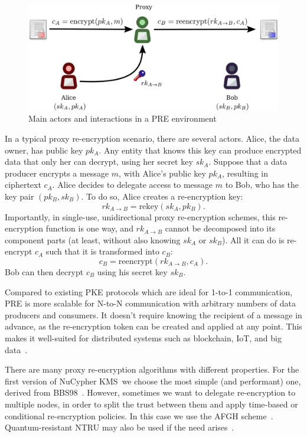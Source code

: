 \documentclass[longbibliography,nofootinbib]{revtex4-1}
\newcommand{\kms}{NuCypher KMS}
\begin{document}
\begin{figure}
\centering
    \includegraphics[width=0.6\columnwidth]{pdf/pre.pdf}
    \caption{Main actors and interactions in a PRE environment}
    \label{fig:pre}
\end{figure}

In a typical proxy re-encryption scenario, there are several actors. 
Alice, the data owner, has public key $pk_A$. Any entity that knows this key can produce encrypted data that only her can decrypt, using her secret key $sk_A$. 
Suppose that a data producer encrypts a message $m$, with Alice's public key $pk_A$, 
resulting in ciphertext $c_A$.
Alice decides to delegate access to message $m$ to Bob, who has the key pair $(pk_B, sk_B)$.
To do so, Alice creates a re-encryption key:
\begin{equation}
    rk_{A\rightarrow B} = \text{rekey}(sk_A, pk_B).
\end{equation}
Importantly, in single-use, unidirectional proxy re-encryption schemes, this re-encryption function is one way, and $rk_{A\rightarrow B}$ cannot be decomposed into its component parts
(at least, without also knowing $sk_A$ or $sk_B$).
All it can do is re-encrypt $c_A$ such that it is transformed into $c_B$:
\begin{equation}
    c_B = \text{reencrypt}(rk_{A\rightarrow B}, c_{A}).
\end{equation}
Bob can then decrypt $c_{B}$ using his secret key $sk_{B}$.

Compared to existing PKE protocols which are ideal for 1-to-1 communication, PRE is more scalable for N-to-N communication
with arbitrary numbers of data producers and consumers.
It doesn't require knowing the recipient of a message in advance, as the re-encryption token can be created and applied at any point.
This makes it well-suited for distributed systems such as blockchain, IoT, and big data~\cite{web:nucypher-hadoop}.

There are many proxy re-encryption algorithms with different properties.
For the first version of \kms~we choose the most simple (and performant) one, derived from BBS98~\cite{BBS98}.
However, sometimes we want to delegate re-encryption to multiple nodes, in order to split the trust between them and apply time-based or conditional
re-encryption policies.
In this case we use the AFGH scheme~\cite{AFGH}.
Quantum-resistant NTRU may also be used if the need arises~\cite{wiki:ntru,ntrureencrypt}.
\end{document}
